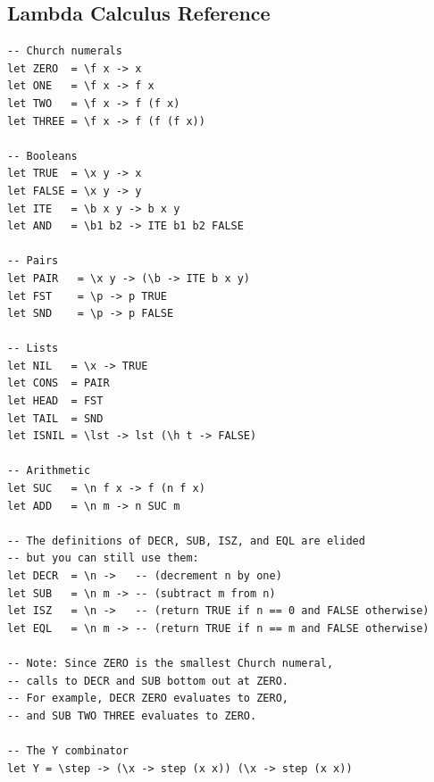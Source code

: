 \documentclass[addpoints]{exam}
\begin{document}
\begin{questions}

\end{questions}

\newpage

\subsection*{Lambda Calculus Reference}

\begin{verbatim}
-- Church numerals
let ZERO  = \f x -> x
let ONE   = \f x -> f x
let TWO   = \f x -> f (f x)
let THREE = \f x -> f (f (f x))

-- Booleans
let TRUE  = \x y -> x
let FALSE = \x y -> y
let ITE   = \b x y -> b x y
let AND   = \b1 b2 -> ITE b1 b2 FALSE

-- Pairs
let PAIR   = \x y -> (\b -> ITE b x y)
let FST    = \p -> p TRUE
let SND    = \p -> p FALSE

-- Lists
let NIL   = \x -> TRUE
let CONS  = PAIR
let HEAD  = FST
let TAIL  = SND
let ISNIL = \lst -> lst (\h t -> FALSE)

-- Arithmetic
let SUC   = \n f x -> f (n f x)
let ADD   = \n m -> n SUC m

-- The definitions of DECR, SUB, ISZ, and EQL are elided
-- but you can still use them:
let DECR  = \n ->   -- (decrement n by one)
let SUB   = \n m -> -- (subtract m from n)
let ISZ   = \n ->   -- (return TRUE if n == 0 and FALSE otherwise)
let EQL   = \n m -> -- (return TRUE if n == m and FALSE otherwise)

-- Note: Since ZERO is the smallest Church numeral,
-- calls to DECR and SUB bottom out at ZERO.
-- For example, DECR ZERO evaluates to ZERO,
-- and SUB TWO THREE evaluates to ZERO.

-- The Y combinator
let Y = \step -> (\x -> step (x x)) (\x -> step (x x))
\end{verbatim}
\end{document}
